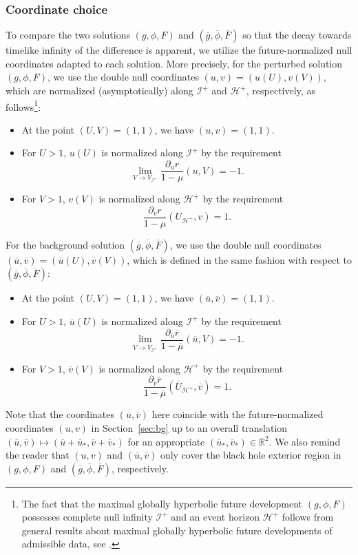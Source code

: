 \documentclass[10pt, reqno]{amsart}
\theoremstyle{definition}
\theoremstyle{remark}
\theoremstyle{conjecture}
\numberwithin{equation}{section}
\newcommand{\rd}{\partial}
\newcommand{\0}{\emptyset}
\newcommand{\bbR}{\mathbb R}
\newcommand{\calH}{\mathcal H}
\newcommand{\calI}{\mathcal I}
\newcommand{\EH}{\calH^{+}}
\newcommand{\NI}{\calI^{+}}						%
\newcommand{\gbg}{\overline{g}}					%
\newcommand{\Fbg}{\overline{F}}					%
\newcommand{\ubg}{\overline{u}}					%
\newcommand{\vbg}{\overline{v}}					%
\newcommand{\phibg}{\overline{\phi}}				%
\newcommand{\rbg}{\overline{r}}					%
\newcommand{\mubg}{\overline{\mu}}				%
\begin{document}
\subsubsection*{Coordinate choice}
To compare the two solutions $(g, \phi, F)$ and $(\gbg, \phibg, \Fbg)$ so that the decay towards timelike infinity of the difference is apparent, we utilize the future-normalized null coordinates adapted to each solution. More precisely, for the perturbed solution $(g, \phi, F)$, we use the double null  coordinates $(u, v) = (u(U), v(V))$, which are normalized (asymptotically) along $\NI$ and $\EH$, respectively, as follows\footnote{The fact that the maximal globally hyperbolic future development $(g, \phi, F)$ possesses complete null infinity $\NI$ and an event horizon $\EH$ follows from general results about maximal globally hyperbolic future developments of admissible data, see \cite{LO.interior}.}:
\begin{itemize}
\item At the point $(U, V) = (1, 1)$, we have $(u, v) = (1, 1)$. 
\item For $U > 1$, $u(U)$ is normalized along $\NI$ by the requirement
\begin{equation}  \label{eq:coord-u}
	\lim_{V \to V_{\NI}} \frac{\rd_{u} r}{1-\mu}(u, V) = -1.
\end{equation}
\item For $V > 1$, $v(V)$ is normalized along $\EH$ by the requirement
\begin{equation} \label{eq:coord-v}
	\frac{\rd_{v} r}{1-\mu}(U_{\EH}, v) = 1.
\end{equation}
\end{itemize}
For the background solution $(\gbg, \phibg, \Fbg)$, we use the double null coordinates $(\ubg, \vbg) = (\ubg(U), \vbg(V))$, which is defined in the same fashion with respect to $(\gbg, \phibg, \Fbg)$:
\begin{itemize}
\item At the point $(U, V) = (1, 1)$, we have $(\ubg, \vbg) = (1, 1)$. 
\item For $U > 1$, $\ubg(U)$ is normalized along $\NI$ by the requirement
\begin{equation}  \label{eq:coord-u-bg}
	\lim_{V \to \overline{V}_{\NI}} \frac{\rd_{\ubg} \rbg}{1-\mubg}(\ubg, V) = -1.
\end{equation}
\item For $V > 1$, $\vbg(V)$ is normalized along $\EH$ by the requirement
\begin{equation} \label{eq:coord-v-bg}
	\frac{\rd_{\vbg} \rbg}{1-\mubg}(\overline{U}_{\EH}, \vbg) = 1.
\end{equation}
\end{itemize}
Note that the coordinates $(\ubg, \vbg)$ here coincide with the future-normalized coordinates $(u, v)$ in Section~\ref{sec:bg} up to an overall translation $(\ubg, \vbg) \mapsto (\ubg + \ubg_{\ast}, \vbg + \vbg_{\ast})$ for an appropriate $(\ubg_{\ast}, \vbg_{\ast}) \in \bbR^{2}$. We also remind the reader that $(u, v)$ and $(\ubg, \vbg)$ only cover the black hole exterior region in $(g, \phi, F)$ and $(\gbg, \phibg, \Fbg)$, respectively.
\end{document}
